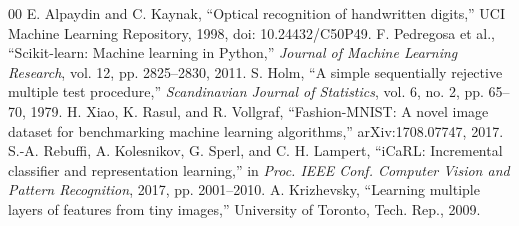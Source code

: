\documentclass[conference]{IEEEtran}
\begin{document}
\begin{thebibliography}{00}
 E. Alpaydin and C. Kaynak, ``Optical recognition of handwritten digits,'' UCI Machine Learning Repository, 1998, doi: 10.24432/C50P49.
 F. Pedregosa et al., ``Scikit-learn: Machine learning in Python,'' \emph{Journal of Machine Learning Research}, vol. 12, pp. 2825--2830, 2011.
 S. Holm, ``A simple sequentially rejective multiple test procedure,'' \emph{Scandinavian Journal of Statistics}, vol. 6, no. 2, pp. 65--70, 1979.
 H. Xiao, K. Rasul, and R. Vollgraf, ``Fashion-MNIST: A novel image dataset for benchmarking machine learning algorithms,'' arXiv:1708.07747, 2017.
 S.-A. Rebuffi, A. Kolesnikov, G. Sperl, and C. H. Lampert, ``iCaRL: Incremental classifier and representation learning,'' in \emph{Proc. IEEE Conf. Computer Vision and Pattern Recognition}, 2017, pp. 2001--2010.
 A. Krizhevsky, ``Learning multiple layers of features from tiny images,'' University of Toronto, Tech. Rep., 2009.
\end{thebibliography}
\end{document}
